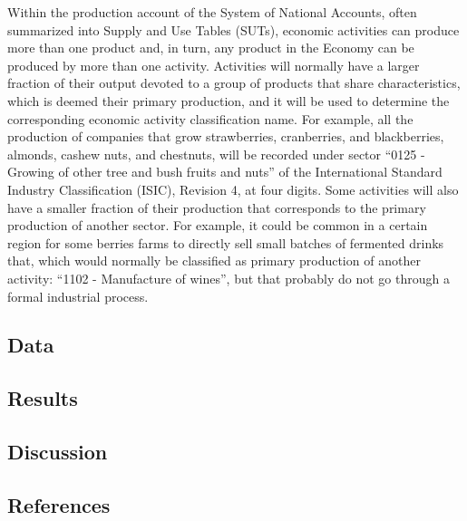 \documentclass[
  letterpaper,
  DIV=11,
  numbers=noendperiod]{scrartcl}
\begin{document}
Within the production account of the System of National Accounts, often
summarized into Supply and Use Tables (SUTs), economic activities can
produce more than one product and, in turn, any product in the Economy
can be produced by more than one activity. Activities will normally have
a larger fraction of their output devoted to a group of products that
share characteristics, which is deemed their primary production, and it
will be used to determine the corresponding economic activity
classification name. For example, all the production of companies that
grow strawberries, cranberries, and blackberries, almonds, cashew nuts,
and chestnuts, will be recorded under sector ``0125 - Growing of other
tree and bush fruits and nuts'' of the International Standard Industry
Classification (ISIC), Revision 4, at four digits. Some activities will
also have a smaller fraction of their production that corresponds to the
primary production of another sector. For example, it could be common in
a certain region for some berries farms to directly sell small batches
of fermented drinks that, which would normally be classified as primary
production of another activity: ``1102 - Manufacture of wines'', but
that probably do not go through a formal industrial process.

\subsection{Data}\label{data}

\subsection{Results}\label{results}

\subsection{Discussion}\label{discussion}

\subsection*{References}\label{references}
\end{document}
